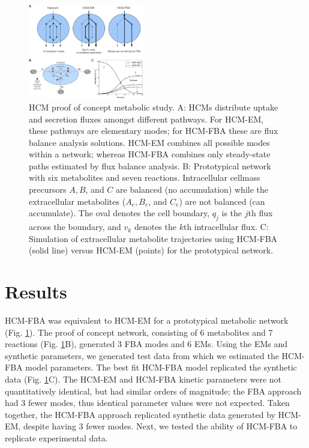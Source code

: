 \documentclass[10pt,twocolumn,twoside,final]{IEEEtran}
\begin{document}

\begin{figure}[!t]\centering
\includegraphics[width=0.45\textwidth]{./figs/Fig-1-Method-General.pdf}
\caption{HCM proof of concept metabolic study.
A: HCMs distribute uptake and secretion fluxes amongst different pathways. For HCM-EM, these pathways are elementary modes; for HCM-FBA these are flux balance analysis solutions.
HCM-EM combines all possible modes within a network; whereas HCM-FBA combines only steady-state paths estimated by flux balance analysis.
B: Prototypical network with six metabolites and seven reactions.
Intracellular cellmass precursors $A,B$, and $C$ are balanced (no accumulation) while the extracellular metabolites ($A_{e},B_{e}$, and $C_{e}$) are not balanced (can accumulate).
The oval denotes the cell boundary, $q_{j}$ is the $j$th flux across the boundary, and $v_{k}$ denotes the $k$th intracellular flux.
C: Simulation of extracellular metabolite trajectories using HCM-FBA (solid line) versus HCM-EM (points) for the prototypical network.
}\label{fig:model-fitting}
\end{figure}

\section{Results}
HCM-FBA was equivalent to HCM-EM for a prototypical metabolic network (Fig. \ref{fig:model-fitting}).
The proof of concept network, consisting of 6 metabolites and 7 reactions (Fig. \ref{fig:model-fitting}B), generated 3 FBA modes and 6 EMs.
Using the EMs and synthetic parameters, we generated test data from which we estimated the HCM-FBA model parameters.
The best fit HCM-FBA model replicated the synthetic data (Fig. \ref {fig:model-fitting}C).
The HCM-EM and HCM-FBA kinetic parameters were not quantitatively identical, but had similar orders of magnitude;
the FBA approach had 3 fewer modes, thus identical parameter values were not expected.
Taken together, the HCM-FBA approach replicated synthetic data generated by HCM-EM, despite having 3 fewer modes.
Next, we tested the ability of HCM-FBA to replicate experimental data.
\end{document}
